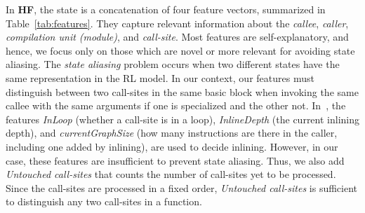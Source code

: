 In \textbf{HF}, the state is a concatenation of four feature vectors,
summarized in Table~\ref{tab:features}. They capture relevant
information about the \emph{callee}, \emph{caller}, \emph{compilation
  unit (module)}, and \emph{call-site}. Most features are
self-explanatory, and hence, we focus only on those which are novel or
more relevant for avoiding state aliasing.
%
%
The \emph{state aliasing} problem occurs when two different states
have the same representation in the RL model. In our context, our
features must distinguish between two call-sites in the same basic
block when invoking the same callee with the same arguments if one is
specialized and the other not.  In~\cite{KulkarniCWS13}, the features
\emph{InLoop} (whether a call-site is in a loop), \emph{InlineDepth}
(the current inlining depth), and \emph{currentGraphSize} (how many
instructions are there in the caller, including one added by
inlining), are used to decide inlining.  However, in our case, these
features are insufficient to prevent state aliasing.  Thus, we also
add \emph{Untouched call-sites} that counts the number of call-sites
yet to be processed. Since the call-sites are processed in a fixed
order, \emph{Untouched call-sites} is sufficient to distinguish any
two call-sites in a function.








